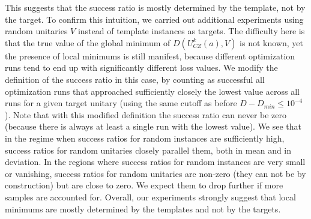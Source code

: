 \documentclass[twocolumn, amsfonts, amssymb, aps, nofootinbib]{revtex4-2}
\begin{document}
This suggests that the success ratio is mostly determined by the template, not by the target. To confirm this  intuition,  we carried out additional experiments using random unitaries $V$ instead of template instances as targets. The difficulty here is that the true value of the global minimum of $D(U^k_{CZ}(a), V)$ is not known, yet the presence of local minimums is still manifest, because different optimization runs tend to end up with significantly different loss values. We modify the definition of the success ratio in this case, by counting as successful all optimization runs that approached sufficiently closely the lowest value across all runs for a given target unitary (using the same cutoff as before $D-D_{min}\le 10^{-4}$). Note that with this modified definition the success ratio can never be zero (because there is always at least a single run with the lowest value). We see that in the regime when success ratios for random instances are sufficiently high, success ratios for random unitaries closely parallel them, both in mean and in deviation. In the regions where success ratios for random instances are very small or vanishing, success ratios for random unitaries are non-zero (they can not be by construction) but are close to zero. We expect them to drop further if more samples are accounted for. Overall, our experiments strongly suggest that local minimums are mostly determined by the templates and not by the targets.
\end{document}

